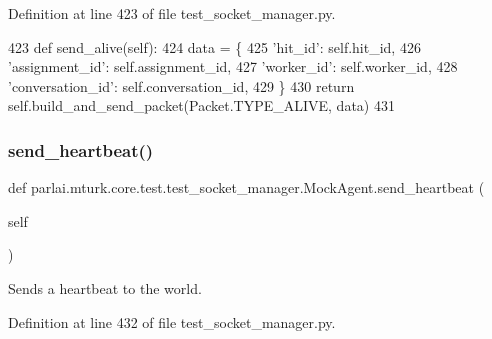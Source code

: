 Definition at line 423 of file test\+\_\+socket\+\_\+manager.\+py.


\begin{DoxyCode}
423     \textcolor{keyword}{def }send\_alive(self):
424         data = \{
425             \textcolor{stringliteral}{'hit\_id'}: self.hit\_id,
426             \textcolor{stringliteral}{'assignment\_id'}: self.assignment\_id,
427             \textcolor{stringliteral}{'worker\_id'}: self.worker\_id,
428             \textcolor{stringliteral}{'conversation\_id'}: self.conversation\_id,
429         \}
430         \textcolor{keywordflow}{return} self.build\_and\_send\_packet(Packet.TYPE\_ALIVE, data)
431 
\end{DoxyCode}
\mbox{\label{classparlai_1_1mturk_1_1core_1_1test_1_1test__socket__manager_1_1MockAgent_ad0ffb0ccd7e4ea967910e322aa698537}} 
\subsubsection{\texorpdfstring{send\+\_\+heartbeat()}{send\_heartbeat()}}
{\footnotesize\ttfamily def parlai.\+mturk.\+core.\+test.\+test\+\_\+socket\+\_\+manager.\+Mock\+Agent.\+send\+\_\+heartbeat (\begin{DoxyParamCaption}\item[{}]{self }\end{DoxyParamCaption})}

\begin{DoxyVerb}Sends a heartbeat to the world.
\end{DoxyVerb}
 

Definition at line 432 of file test\+\_\+socket\+\_\+manager.\+py.


